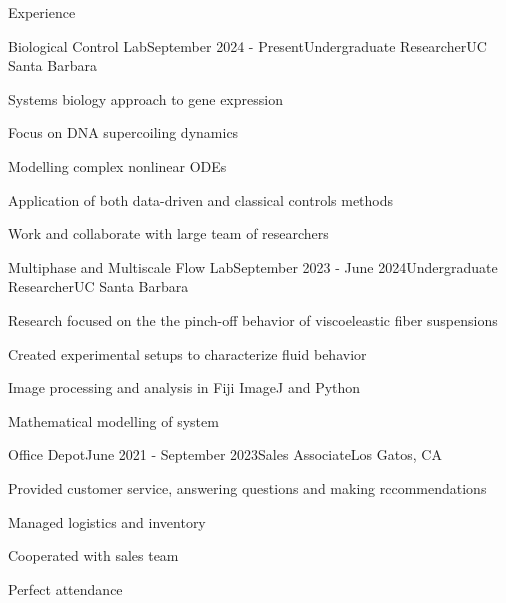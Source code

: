 \documentclass[
	11pt, %
]{resume} %
\begin{document}
\begin{rSection}{Experience}

	\begin{rSubsection}{Biological Control Lab}{September 2024 - Present}{Undergraduate Researcher}{UC Santa Barbara}
		\item Systems biology approach to gene expression
		\item Focus on DNA supercoiling dynamics
		\item Modelling complex nonlinear ODEs
		\item Application of both data-driven and classical controls methods
		\item Work and collaborate with large team of researchers
	\end{rSubsection}


	\begin{rSubsection}{Multiphase and Multiscale Flow Lab}{September 2023 - June 2024}{Undergraduate Researcher}{UC Santa Barbara}
		\item Research focused on the the pinch-off behavior of viscoeleastic fiber suspensions
		\item Created experimental setups to characterize fluid behavior
		\item Image processing and analysis in Fiji ImageJ and Python
		\item Mathematical modelling of system
	\end{rSubsection}


	\begin{rSubsection}{Office Depot}{June 2021 - September 2023}{Sales Associate}{Los Gatos, CA}
		\item Provided customer service, answering questions and making rccommendations
		\item Managed logistics and inventory
		\item Cooperated with sales team
		\item Perfect attendance
	\end{rSubsection}

\end{rSection}

\end{document}

